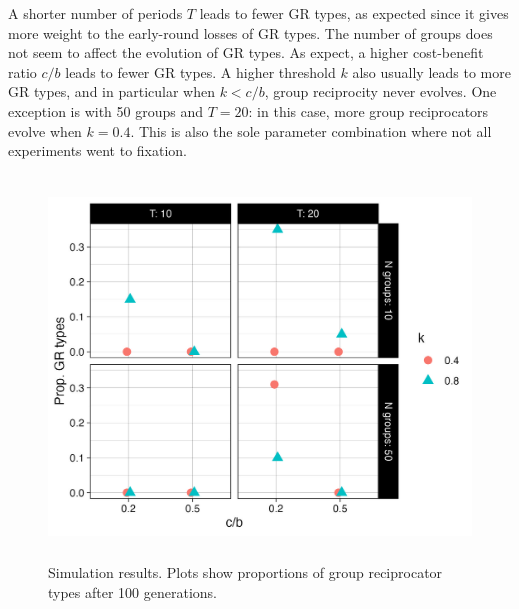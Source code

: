 \documentclass[12pt,a4paper]{article}
\begin{document}
A shorter number of periods $T$ leads to fewer 
GR types, as expected since it gives more weight to the early-round losses of GR 
types. The number of groups does not seem to affect the evolution of GR types. As
expect, a higher cost-benefit ratio $c/b$ leads to fewer GR types. A higher threshold $k$
also usually leads to more GR types, and in particular when $k < c/b$, group reciprocity
never evolves. One exception is with 50 groups and $T = 20$: in this case,
more group reciprocators evolve when $k = 0.4$. This is also the sole
parameter combination where not all experiments went to fixation.

\begin{figure}[h]
  \caption{Simulation results. Plots show proportions of group reciprocator types after 100 generations.}
  \label{fig:sims}
  \centering
    \includegraphics[height=4in]{R files/basic-experiment.jpeg}
\end{figure}
\end{document}
